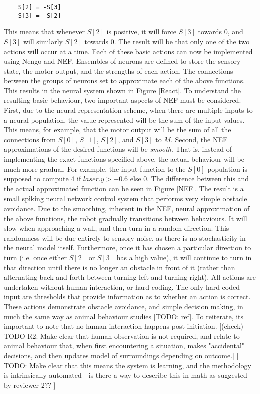 \documentclass[conference]{IEEEtran}
\begin{document}
\begin{lstlisting}
	S[2] = -S[3]
	S[3] = -S[2]
\end{lstlisting}
This means that whenever $S[2]$ is positive, it will force $S[3]$ towards 0, and $S[3]$ will similarly $S[2]$ towards $0$.
The result will be that only one of the two actions will occur at a time.
Each of these basic actions can now be implemented using Nengo and NEF. Ensembles of neurons are defined to store the sensory state, the motor output, and the strengths of each action. The connections between the groups of neurons set to approximate each of the above functions. This results in the neural system shown in Figure \ref{React}. To understand the resulting basic behaviour, two important aspects of NEF must be considered. First, due to the neural representation scheme, when there are multiple inputs to a neural population, the value represented will be the sum of the input values. This means, for example, that the motor output will be the sum of all the connections from $S[0]$, $S[1]$, $S[2]$, and $S[3]$ to $M$. Second, the NEF approximations of the desired functions will be \textit{smooth}. That is, instead of implementing the exact functions specified above, the actual behaviour will be much more gradual. For example, the input function to the $S[0]$ population is supposed to compute $4$ if $laser.y > -0.6$ else $0$. The difference between this and the actual approximated function can be seen in Figure \ref{NEF}.
The result is a small spiking neural network control system that performs very simple obstacle avoidance. Due to the smoothing, inherent in the NEF, neural approximation of the above functions, the robot gradually transitions
between behaviours. It will slow when approaching a wall, and then turn in a random direction. This randomness will be due entirely to sensory noise, as there is no stochasticity in the neural model itself. Furthermore, once it has chosen a particular direction to turn (i.e. once either $S[2]$ or $S[3]$ has a high value), it will continue to turn in that direction until there is no longer an obstacle in front of it (rather than alternating back and forth between turning left and turning right). All actions are undertaken without human interaction, or hard coding. The only hard coded input are thresholds that provide information as to whether an action is correct. These actions demonstrate obstacle avoidance, and simple decision making, in much the same way as animal behaviour studies  [TODO: ref]. To reiterate, its important to note that no human interaction happens post initiation. [(check) TODO R2: Make clear that human observation is not required, and relate to animal behaviour that, when first encountering a situation, makes "accidental" decisions, and then updates model of surroundings depending on outcome.] [ TODO: Make clear that this means the system is learning, and the methodology is intrinsically automated - is there a way to describe this in math as suggested by reviewer 2?? ]
\end{document}
